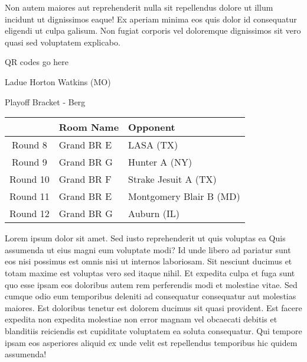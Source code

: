 \documentclass{article}%
\begin{document}
\newline%
Non autem maiores aut reprehenderit nulla sit repellendus dolore ut illum incidunt ut dignissimos eaque! Ex aperiam minima eos quis dolor id consequatur eligendi ut culpa galisum. Non fugiat corporis vel doloremque dignissimos sit vero quasi sed voluptatem explicabo.\newline%
\newline%
%
\vspace*{30pt}%
\begin{center}%
\begin{Huge}%
QR codes go here%
\end{Huge}%
\end{center}%
\newpage%
\begin{center}%
\begin{Huge}%
Ladue Horton Watkins (MO)%
\end{Huge}%
\vspace*{8pt}%
\linebreak%
\begin{Large}%
Playoff Bracket {-} Berg%
\end{Large}%
\end{center}%
%
\begin{tabularx}{\textwidth}{|c|Y|Y|}%
\hline%
&Room Name&Opponent\\%
\hline%
Round 8&Grand BR E&LASA (TX)\\%
Round 9&Grand BR G&Hunter A (NY)\\%
Round 10&Grand BR F&Strake Jesuit A (TX)\\%
Round 11&Grand BR E&Montgomery Blair B (MD)\\%
Round 12&Grand BR G&Auburn (IL)\\%
\hline%
\end{tabularx}%
\vspace*{8pt}%
\linebreak%
\newline%
\newline%
Lorem ipsum dolor sit amet. Sed iusto reprehenderit ut quis voluptas ea Quis assumenda ut eius magni eum voluptate modi? Id unde libero ad pariatur sunt eos nisi possimus est omnis nisi ut internos laboriosam. Sit nesciunt ducimus et totam maxime est voluptas vero sed itaque nihil. Et expedita culpa et fuga sunt quo esse ipsam eos doloribus autem rem perferendis modi et molestiae vitae.\newline%
\newline%
Sed cumque odio eum temporibus deleniti ad consequatur consequatur aut molestias maiores. Est doloribus tenetur est dolorem ducimus sit quasi provident. Est facere expedita non expedita molestiae non error magnam vel obcaecati debitis et blanditiis reiciendis est cupiditate voluptatem ea soluta consequatur. Qui tempore ipsam eos asperiores aliquid ex unde velit est repellendus temporibus hic quidem assumenda!\newline%
\end{document}
